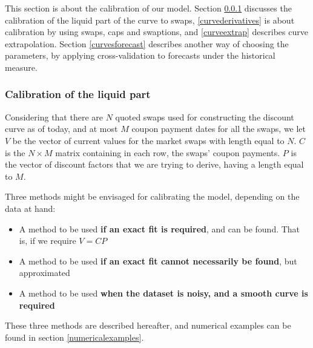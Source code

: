 This section is about the calibration of our model. Section \ref{curve_calibration} discusses the calibration of the liquid part of the curve to swaps, \ref{curvederivatives} is about calibration by using swaps, caps and swaptions, and \ref{curveextrap} describes curve extrapolation. Section \ref{curvesforecast} describes another way of choosing the parameters, by applying cross-validation to forecasts under the historical measure.

\subsubsection{Calibration of the liquid part}
\label{curve_calibration}

Considering that there are $N$ quoted swaps used for constructing the discount curve as of today, and at most $M$ coupon payment dates for all the swaps, we let $V$ be the vector of current values for the market swaps with length equal to $N$. $C$ is the $N \times M$ matrix containing in each row, the swaps' coupon payments. $P$ is  the vector of discount factors that we are trying to derive, having a length equal to $M$.

\medskip

Three methods might be envisaged for calibrating the model, depending on the data at hand:
\begin{itemize}
\item A method to be used \textbf{if an exact fit is required}, and can be found. That is, if we require $V = CP$
\medskip
\item A method to be used \textbf{if an exact fit cannot necessarily be found}, but approximated
\item A method to be used \textbf{when the dataset is noisy, and a smooth curve is required}
\end{itemize}
These three methods are described hereafter, and numerical examples can be found in section \ref{numericalexamples}.

